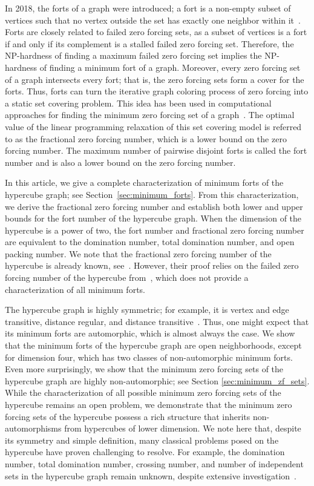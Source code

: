 \documentclass[twoside, 12pt]{article}
\theoremstyle{definition}
\begin{document}
In 2018, the forts of a graph were introduced; a fort is a non-empty subset of vertices such that no vertex outside the set has exactly one neighbor within it~\cite{Fast2018}. Forts are closely related to failed zero forcing sets, as a subset of vertices is a fort if and only if its complement is a stalled failed zero forcing set.
Therefore, the NP-hardness of finding a maximum failed zero forcing set implies the NP-hardness of finding a minimum fort of a graph. 
Moreover, every zero forcing set of a graph intersects every fort; that is, the zero forcing sets form a cover for the forts. Thus, forts can turn the iterative graph coloring process of zero forcing into a static set covering problem. This idea has been used in computational approaches for finding the minimum zero forcing set of a graph~\cite{Brimkov2019, Brimkov2021, Cameron2023, Fast2018}. The optimal value of the linear programming relaxation of this set covering model is referred to as the fractional zero forcing number, which is a lower bound on the zero forcing number. The maximum number of pairwise disjoint forts is called the fort number and is also a lower bound on the zero forcing number. 

In this article, we give a complete characterization of minimum forts of the hypercube graph; see Section~\ref{sec:minimum_forts}. From this characterization, we derive the fractional zero forcing number and establish both lower and upper bounds for the fort number of the hypercube graph. When the dimension of the hypercube is a power of two, the fort number and fractional zero forcing number are equivalent to the domination number, total domination number, and open packing number. We note that the fractional zero forcing number of the hypercube is already known, see~\cite[Proposition 3.15]{Cameron2023}. However, their proof relies on the failed zero forcing number of the hypercube from~\cite[Theorem 4.2]{Afzali2024}, which does not provide a characterization of all minimum forts. 

The hypercube graph is highly symmetric; for example, it is vertex and edge transitive, distance regular, and distance transitive~\cite{Mirafzal2025}. Thus, one might expect that its minimum forts are automorphic, which is almost always the case. We show that the minimum forts of the hypercube graph are open neighborhoods, except for dimension four, which has two classes of non-automorphic minimum forts. Even more surprisingly, we show that the minimum zero forcing sets of the hypercube graph are highly non-automorphic; see Section \ref{sec:minimum_zf_sets}. While the characterization of all possible minimum zero forcing sets of the hypercube remains an open problem, we demonstrate that the minimum zero forcing sets of the hypercube possess a rich structure that inherits non-automorphisms from hypercubes of lower dimension.
We note here that, despite its symmetry and simple definition, many classical problems posed on the hypercube have proven challenging to resolve. For example, the domination number, total domination number, crossing number, and number of independent sets in the hypercube graph remain unknown, despite extensive investigation~\cite{Azarija2017, Bertolo2004, Erdos1973, Jenssen2022}.
\end{document}
